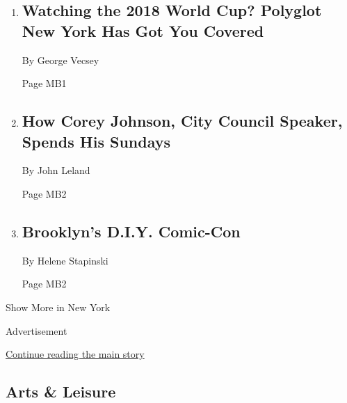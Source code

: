 \begin{enumerate}
\def\labelenumi{\arabic{enumi}.}
\item
  \href{/2018/06/15/nyregion/watch-world-cup-new-york.html}{}

  \hypertarget{watching-the-2018-world-cup-polyglot-new-york-has-got-you-covered}{%
  \subsection{Watching the 2018 World Cup? Polyglot New York Has Got You
  Covered}\label{watching-the-2018-world-cup-polyglot-new-york-has-got-you-covered}}

  By George Vecsey

  Page MB1
\item
  \href{/2018/06/15/nyregion/how-corey-johnson-city-council-speaker-spends-his-sundays.html}{}

  \hypertarget{how-corey-johnson-city-council-speaker-spends-his-sundays}{%
  \subsection{How Corey Johnson, City Council Speaker, Spends His
  Sundays}\label{how-corey-johnson-city-council-speaker-spends-his-sundays}}

  By John Leland

  Page MB2
\item
  \href{/2018/06/14/nyregion/brooklyn-superhero-festival.html}{}

  \hypertarget{brooklyns-diy-comic-con}{%
  \subsection{Brooklyn's D.I.Y.
  Comic-Con}\label{brooklyns-diy-comic-con}}

  By Helene Stapinski

  Page MB2
\end{enumerate}

Show More in New York

Advertisement

\protect\hyperlink{after-mid3}{Continue reading the main story}

\hypertarget{arts--leisure}{%
\subsection{Arts \& Leisure}\label{arts--leisure}}

